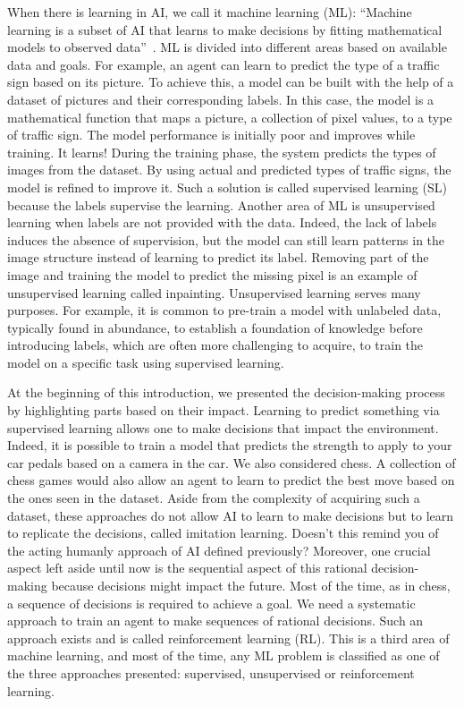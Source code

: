 When there is learning in AI, we call it machine learning (ML): ``Machine learning is a subset of AI that learns to make decisions by fitting mathematical models to observed data''~\citep{prince2023understanding}.
ML is divided into different areas based on available data and goals.
For example, an agent can learn to predict the type of a traffic sign based on its picture.
To achieve this, a model can be built with the help of a dataset of pictures and their corresponding labels.
In this case, the model is a mathematical function that maps a picture, a collection of pixel values, to a type of traffic sign.
The model performance is initially poor and improves while training. 
It learns!
During the training phase, the system predicts the types of images from the dataset.
By using actual and predicted types of traffic signs, the model is refined to improve it.
Such a solution is called supervised learning (SL) because the labels supervise the learning.
Another area of ML is unsupervised learning when labels are not provided with the data.
Indeed, the lack of labels induces the absence of supervision, but the model can still learn patterns in the image structure instead of learning to predict its label.
Removing part of the image and training the model to predict the missing pixel is an example of unsupervised learning called inpainting.
Unsupervised learning serves many purposes.
For example, it is common to pre-train a model with unlabeled data, typically found in abundance, to establish a foundation of knowledge before introducing labels, which are often more challenging to acquire, to train the model on a specific task using supervised learning.

At the beginning of this introduction, we presented the decision-making process by highlighting parts based on their impact.
Learning to predict something via supervised learning allows one to make decisions that impact the environment.
Indeed, it is possible to train a model that predicts the strength to apply to your car pedals based on a camera in the car.
We also considered chess.
A collection of chess games would also allow an agent to learn to predict the best move based on the ones seen in the dataset.
Aside from the complexity of acquiring such a dataset, these approaches do not allow AI to learn to make decisions but to learn to replicate the decisions, called imitation learning.
Doesn't this remind you of the acting humanly approach of AI defined previously?
Moreover, one crucial aspect left aside until now is the sequential aspect of this rational decision-making because decisions might impact the future.
Most of the time, as in chess, a sequence of decisions is required to achieve a goal.
We need a systematic approach to train an agent to make sequences of rational decisions.
Such an approach exists and is called reinforcement learning (RL).
This is a third area of machine learning, and most of the time, any ML problem is classified as one of the three approaches presented: supervised, unsupervised or reinforcement learning.

